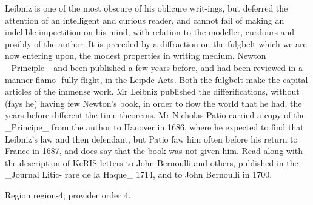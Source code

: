\documentclass[11pt]{article}
\begin{document}
Leibniz is one of the most obscure of his oblicure writ-ings, but deferred the attention of an intelligent and curious reader, and cannot fail of making an indelible impectition on his mind, with relation to the modeller, curdours and posibly of the author. It is preceded by a diffraction on the fulgbelt which we are now entering upon, the modest properties in writing medium. Newton \_Principle\_ and been published a few years before, and had been reviewed in a manner flamo- fully flight, in the Leipde Acts. Both the fulgbelt make the capital articles of the immense work. Mr Leibniz published the differifications, without (fays he) having few Newton's book, in order to flow the world that he had, the years before different the time theorems. Mr Nicholas Patio carried a copy of the \_Principe\_ from the author to Hanover in 1686, where he expected to find that Leibniz's law and then defendant, but Patio faw him often before his return to France in 1687, and does say that the book was not given him. Read along with the description of KeRIS letters to John Bernoulli and others, published in the \_Journal Litic- rare de la Haque\_ 1714, and to John Bernoulli in 1700.
\par

{\scriptsize\color{gray} Region region-4; provider order 4.\par}
\medskip
\end{document}
